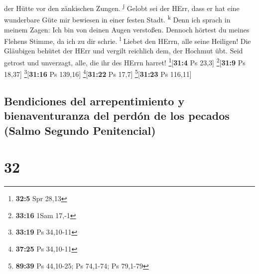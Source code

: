 der Hütte vor den zänkischen Zungen. \textsuperscript{j} 
Gelobt sei der HErr, dass er hat eine wunderbare Güte mir bewiesen in
einer festen Stadt. \textsuperscript{k}  Denn ich sprach
in meinem Zagen: Ich bin von deinen Augen verstoßen. Dennoch hörtest du
meines Flehens Stimme, da ich zu dir schrie. \textsuperscript{l}
 Liebet den HErrn, alle seine Heiligen! Die Gläubigen
behütet der HErr und vergilt reichlich dem, der Hochmut übt.
 Seid getrost und unverzagt, alle, die ihr des HErrn
harret! \footnote{\textbf{32:5} Spr 28,13}{[}\textbf{31:4} Ps 23,3{]}
\footnote{\textbf{33:16} 1Sam 17,-1}{[}\textbf{31:9} Ps 18,37{]}
\footnote{\textbf{33:19} Ps 34,10-11}{[}\textbf{31:16} Ps 139,16{]}
\footnote{\textbf{37:25} Ps 34,10-11}{[}\textbf{31:22} Ps 17,7{]}
\footnote{\textbf{89:39} Ps 44,10-25; Ps 74,1-74; Ps 79,1-79}{[}\textbf{31:23}
Ps 116,11{]}

\hypertarget{bendiciones-del-arrepentimiento-y-bienaventuranza-del-perduxf3n-de-los-pecados-salmo-segundo-penitencial}{%
\subsection{Bendiciones del arrepentimiento y bienaventuranza del perdón
de los pecados (Salmo Segundo
Penitencial)}\label{bendiciones-del-arrepentimiento-y-bienaventuranza-del-perduxf3n-de-los-pecados-salmo-segundo-penitencial}}

\hypertarget{section-31}{%
\section{32}\label{section-31}}

